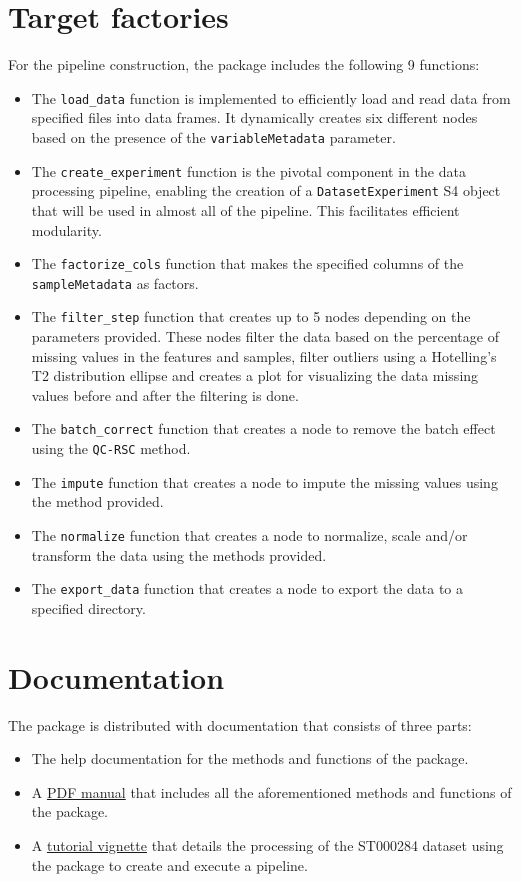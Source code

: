 \documentclass[ENG, BIB]{TFUOC}%
\begin{document}
\section{Target factories}
For the pipeline construction, the package includes the following 9 functions:
\begin{itemize}
    \item The \texttt{load\_data} function is implemented to efficiently load and read data from specified files into data frames. It dynamically creates six different nodes based on the presence of the \texttt{variableMetadata} parameter.
    \item The \texttt{create\_experiment} function is the pivotal component in the data processing pipeline, enabling the creation of a \texttt{DatasetExperiment} S4 object that will be used in almost all of the pipeline. This facilitates efficient modularity.
    \item The \texttt{factorize\_cols} function that makes the specified columns of the \texttt{sampleMetadata} as factors.
    \item The \texttt{filter\_step} function that creates up to 5 nodes depending on the parameters provided. These nodes filter the data based on the percentage of missing values in the features and samples, filter outliers using a Hotelling's T2 distribution ellipse and creates a plot for visualizing the data missing values before and after the filtering is done.
    \item The \texttt{batch\_correct} function that creates a node to remove the batch effect using the \texttt{QC-RSC} method.
    \item The \texttt{impute} function that creates a node to impute the missing values using the method provided.
    \item The \texttt{normalize} function that creates a node to normalize, scale and/or transform the data using the methods provided.
    \item The \texttt{export\_data} function that creates a node to export the data to a specified directory.
\end{itemize}

\section{Documentation}
The package is distributed with documentation that consists of three parts:
\begin{itemize}
    \item The help documentation for the methods and functions of the package.
    \item A \href{https://github.com/eperezme/metaboPipe/blob/main/metaboPipe_0.1.pdf}{PDF manual} that includes all the aforementioned methods and functions of the package.
    \item A \href{https://github.com/eperezme/metaboPipe/tree/main/metaboPipe/vignettes}{tutorial vignette} that details the processing of the ST000284 dataset using the package to create and execute a pipeline.
\end{itemize}
\end{document}
